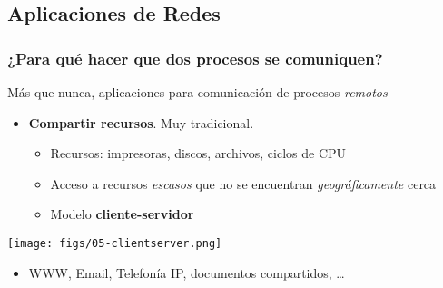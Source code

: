 \documentclass[letter]{beamer}
\begin{document}
\subsection{Aplicaciones de Redes}

\begin{frame}
  \frametitle{¿Para qué hacer que dos procesos se comuniquen?}

  Más que nunca, aplicaciones para comunicación de procesos {\em remotos}
  \begin{itemize}
    \item {\bf Compartir recursos}. Muy tradicional.
      \begin{itemize}
        \item Recursos: impresoras, discos, archivos, ciclos de CPU
        \item Acceso a recursos {\em escasos} que no se encuentran {\em geográficamente} cerca
        \item Modelo {\bf cliente-servidor}
      \end{itemize}
  \end{itemize}
  
  \begin{center}
    \texttt{[image: figs/05-clientserver.png]}
  \end{center}
  
  \begin{itemize}
    \item WWW, Email, Telefonía IP, documentos compartidos, \ldots
  \end{itemize}

\end{frame}
\end{document}
